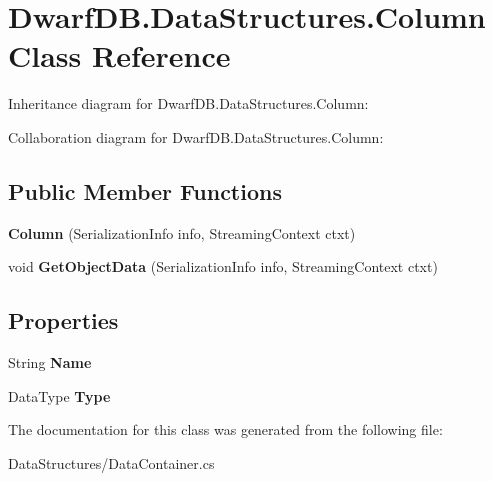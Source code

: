 \hypertarget{class_dwarf_d_b_1_1_data_structures_1_1_column}{\section{Dwarf\+D\+B.\+Data\+Structures.\+Column Class Reference}
\label{class_dwarf_d_b_1_1_data_structures_1_1_column}
}


Inheritance diagram for Dwarf\+D\+B.\+Data\+Structures.\+Column\+:


Collaboration diagram for Dwarf\+D\+B.\+Data\+Structures.\+Column\+:
\subsection*{Public Member Functions}
\begin{DoxyCompactItemize}
\item 
\hypertarget{class_dwarf_d_b_1_1_data_structures_1_1_column_abf5e30f6b3e6c498f0a66d02f7f17214}{{\bfseries Column} (Serialization\+Info info, Streaming\+Context ctxt)}\label{class_dwarf_d_b_1_1_data_structures_1_1_column_abf5e30f6b3e6c498f0a66d02f7f17214}

\item 
\hypertarget{class_dwarf_d_b_1_1_data_structures_1_1_column_a4a4dd5bdf12ad2ab575b62f5a4315d17}{void {\bfseries Get\+Object\+Data} (Serialization\+Info info, Streaming\+Context ctxt)}\label{class_dwarf_d_b_1_1_data_structures_1_1_column_a4a4dd5bdf12ad2ab575b62f5a4315d17}

\end{DoxyCompactItemize}
\subsection*{Properties}
\begin{DoxyCompactItemize}
\item 
\hypertarget{class_dwarf_d_b_1_1_data_structures_1_1_column_a731a4e7a643fd90916b3e54fe5712e9f}{String {\bfseries Name}}\label{class_dwarf_d_b_1_1_data_structures_1_1_column_a731a4e7a643fd90916b3e54fe5712e9f}

\item 
\hypertarget{class_dwarf_d_b_1_1_data_structures_1_1_column_a5221d8051286c8cddc890ab614d8580a}{Data\+Type {\bfseries Type}}\label{class_dwarf_d_b_1_1_data_structures_1_1_column_a5221d8051286c8cddc890ab614d8580a}

\end{DoxyCompactItemize}


The documentation for this class was generated from the following file\+:\begin{DoxyCompactItemize}
\item 
Data\+Structures/Data\+Container.\+cs\end{DoxyCompactItemize}

